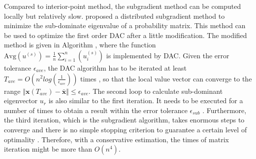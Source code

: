 Compared to interior-point method, the subgradient method can be computed
locally but relatively slow. \cite{Boyd2006} proposed a distributed
subgradient method to minimize the sub-dominate eigenvalue of a probability
matrix. This method can be used to optimize the first order DAC after
a little modification. The modified method is given in Algorithm ,
where the function $\mbox{Avg}\left(u^{\left(s\right)}\right)=\frac{1}{n}\sum_{i=1}^{n}\left(u_{i}^{\left(s\right)}\right)$
is implemented by DAC. Given the error tolerance $\epsilon_{ave}$,
the DAC algorithm has to be iterated at least $T_{ave}=O\left(n^{2}log\left(\frac{1}{\epsilon_{ave}}\right)\right)$
times \cite{Zhou2009}, so that the local value vector can converge
to the range $\left\Vert \mathbf{x}\left(T_{ave}\right)-\mathbf{\bar{x}}\right\Vert \leq\epsilon_{ave}$.
The second loop to calculate sub-dominant eigenvector $u_{r}$ is
also similar to the first iteration. It needs to be executed for a
number of times to obtain a result within the error tolerance $\epsilon_{sub}$
\cite{Boyd2006}. Furthermore, the third iteration, which is the subgradient
algorithm,  takes enormous steps to converge and there is no simple
stopping criterion to guarantee a certain level of optimality \cite{Xiao2004}.
Therefore, with a conservative estimation, the times of matrix iteration
might be more than $O\left(n^{4}\right)$.

